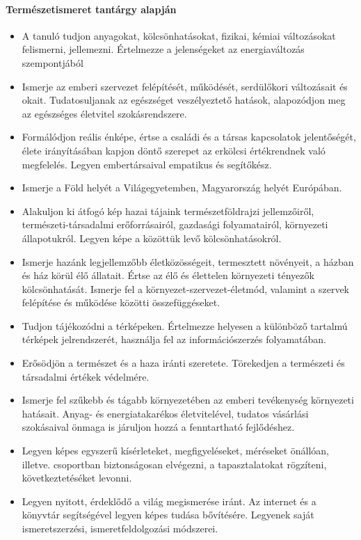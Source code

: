 \paragraph{Természetismeret tantárgy alapján}
\begin{itemize}
\item A tanuló tudjon anyagokat, kölcsönhatásokat, fizikai, kémiai változásokat felismerni, jellemezni. Értelmezze a jelenségeket az energiaváltozás szempontjából
\item Ismerje az emberi szervezet felépítését, működését, serdülőkori változásait és okait. Tudatosuljanak az egészséget veszélyeztető hatások, alapozódjon meg az egészséges életvitel szokásrendszere.
\item Formálódjon reális énképe, értse a családi és a társas kapcsolatok jelentőségét, élete irányításában kapjon döntő szerepet az erkölcsi értékrendnek való megfelelés. Legyen embertársaival empatikus és segítőkész.
\item Ismerje a Föld helyét a Világegyetemben, Magyarország helyét Európában.
\item Alakuljon ki átfogó kép hazai tájaink természetföldrajzi jellemzőiről, természeti-társadalmi erőforrásairól, gazdasági folyamatairól, környezeti állapotukról. Legyen képe a közöttük levő kölcsönhatásokról.
\item Ismerje hazánk legjellemzőbb életközösségeit, termesztett növényeit, a házban és ház körül élő állatait. Értse az élő és élettelen környezeti tényezők kölcsönhatását. Ismerje fel a környezet-szervezet-életmód, valamint a szervek felépítése és működése közötti összefüggéseket.
\item Tudjon tájékozódni a térképeken. Értelmezze helyesen a különböző tartalmú térképek jelrendszerét, használja fel az információszerzés folyamatában.
\item Erősödjön a természet és a haza iránti szeretete. Törekedjen a természeti és társadalmi értékek védelmére.
\item Ismerje fel szűkebb és tágabb környezetében az emberi tevékenység környezeti hatásait. Anyag- és energiatakarékos életvitelével, tudatos vásárlási szokásaival önmaga is járuljon hozzá a fenntartható fejlődéshez.
\item Legyen képes egyszerű kísérleteket, megfigyeléseket, méréseket önállóan, illetve. csoportban biztonságosan elvégezni, a tapasztalatokat rögzíteni, következtetéséket levonni.
\item Legyen nyitott, érdeklődő a világ megismerése iránt. Az internet és a könyvtár segítségével legyen képes tudása bővítésére. Legyenek saját ismeretszerzési, ismeretfeldolgozási módszerei.
\end{itemize}
